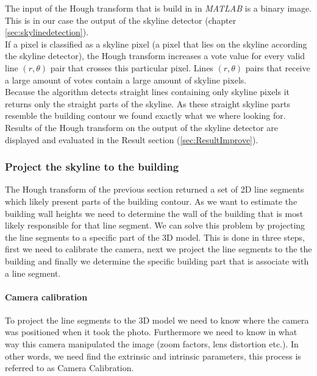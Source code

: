 	The input of the Hough transform that is build in in \emph{MATLAB} is a binary
	image. This is in our case the output of the skyline detector (chapter
	\ref{sec:skylinedetection}).\\
	If a pixel is classified as a skyline pixel (a pixel that lies on the
	skyline according the skyline detector), the Hough transform increases
	a vote value for every valid line $(r,\theta)$ pair that crosses this
	particular pixel.  
	Lines $(r,\theta)$ pairs that receive a large amount of votes
	contain a large amount of skyline pixels.\\
	Because the algorithm detects straight lines containing only skyline pixels
	it returns only the straight parts of the skyline.
	As these straight skyline parts resemble the building contour
	we found exactly what we where looking for.\\

	Results of the Hough transform on the output of the skyline detector are
	displayed and evaluated in the Result section (\ref{sec:ResultImprove}).

\subsubsection{Project the skyline to the building}
	The Hough transform of the previous section returned a set of 2D line
	segments which likely present parts of the building contour.  
	As we want to estimate the building wall heights we need to determine the wall
	of the building that is most likely responsible for that line segment.
	We can solve this problem by projecting the line segments to a specific
	part of the 3D model.
	This is done in three steps, first we need to calibrate the camera, next we
	project the line segments to the the building and finally we 
	determine the specific building part that is associate with a line segment.


	\paragraph{Camera calibration}
	To project the line segments to the 3D model we need to know where the
	camera was positioned when it took the photo. Furthermore we need to know
	in what way this camera manipulated the image (zoom factors, lens distortion
	etc.).  In other words, we need find the extrinsic and intrinsic parameters,
	this process is referred to as Camera Calibration.

